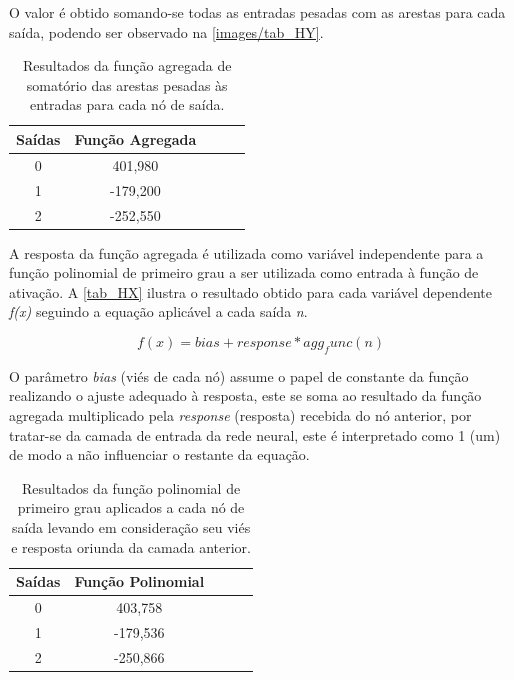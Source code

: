 O valor é obtido somando-se todas as entradas pesadas com as arestas para cada saída, podendo ser observado na \autoref{images/tab_HY}.

\begin{table}[htb]
	\centering
    \caption{\label{tab_HY}Resultados da função agregada de somatório das arestas pesadas às entradas para cada nó de saída.}
    \begin{tabular}{ccccc}
        \hline
		\textbf{Sa\'{i}das} & \textbf{Fun\c{c}\~{a}o Agregada} \\ \hline
		0 & 401,980    \\ \hline
		1 & -179,200    \\ \hline
		2 & -252,550  \\ \hline
    \end{tabular}
    
\end{table}

A resposta da função agregada é utilizada como variável independente para a função polinomial de primeiro grau a ser utilizada
como entrada à função de ativação. A \autoref{tab_HX} ilustra o resultado obtido para cada variável dependente \textit{f(x)}
seguindo a equação aplicável a cada saída \textit{n}.

\[ f(x) = bias + response * agg_func(n)\]

O parâmetro \textit{bias} (viés de cada nó) assume o papel de constante da função realizando o ajuste adequado à resposta,
este se soma ao resultado da função agregada multiplicado pela \textit{response} (resposta) recebida do nó anterior,
por tratar-se da camada de entrada da rede neural, este é interpretado como 1 (um) de modo a não influenciar o restante da equação.

\begin{table}[htb]
	\centering
    \caption{\label{tab_HX}Resultados da função polinomial de primeiro grau aplicados a cada nó de saída levando em consideração seu viés e resposta oriunda da camada anterior.}
    \begin{tabular}{ccccc}
        \hline
		\textbf{Sa\'{i}das} & \textbf{Fun\c{c}\~{a}o Polinomial} \\ \hline
		0 & 403,758    \\ \hline
		1 & -179,536    \\ \hline
		2 & -250,866  \\ \hline
    \end{tabular}
    
\end{table}

